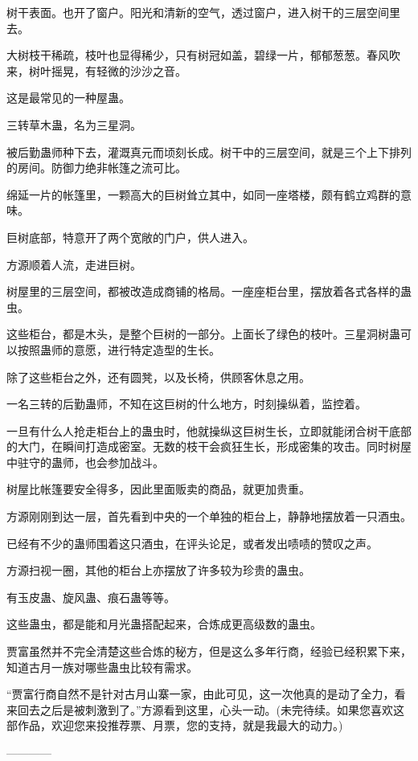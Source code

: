 \begin{this_body}
树干表面。也开了窗户。阳光和清新的空气，透过窗户，进入树干的三层空间里去。

大树枝干稀疏，枝叶也显得稀少，只有树冠如盖，碧绿一片，郁郁葱葱。春风吹来，树叶摇晃，有轻微的沙沙之音。

这是最常见的一种屋蛊。

三转草木蛊，名为三星洞。

被后勤蛊师种下去，灌溉真元而顷刻长成。树干中的三层空间，就是三个上下排列的房间。防御力绝非帐篷之流可比。

绵延一片的帐篷里，一颗高大的巨树耸立其中，如同一座塔楼，颇有鹤立鸡群的意味。

巨树底部，特意开了两个宽敞的门户，供人进入。

方源顺着人流，走进巨树。

树屋里的三层空间，都被改造成商铺的格局。一座座柜台里，摆放着各式各样的蛊虫。

这些柜台，都是木头，是整个巨树的一部分。上面长了绿色的枝叶。三星洞树蛊可以按照蛊师的意愿，进行特定造型的生长。

除了这些柜台之外，还有圆凳，以及长椅，供顾客休息之用。

一名三转的后勤蛊师，不知在这巨树的什么地方，时刻操纵着，监控着。

一旦有什么人抢走柜台上的蛊虫时，他就操纵这巨树生长，立即就能闭合树干底部的大门，在瞬间打造成密室。无数的枝干会疯狂生长，形成密集的攻击。同时树屋中驻守的蛊师，也会参加战斗。

树屋比帐篷要安全得多，因此里面贩卖的商品，就更加贵重。

方源刚刚到达一层，首先看到中央的一个单独的柜台上，静静地摆放着一只酒虫。

已经有不少的蛊师围着这只酒虫，在评头论足，或者发出啧啧的赞叹之声。

方源扫视一圈，其他的柜台上亦摆放了许多较为珍贵的蛊虫。

有玉皮蛊、旋风蛊、痕石蛊等等。

这些蛊虫，都是能和月光蛊搭配起来，合炼成更高级数的蛊虫。

贾富虽然并不完全清楚这些合炼的秘方，但是这么多年行商，经验已经积累下来，知道古月一族对哪些蛊虫比较有需求。

“贾富行商自然不是针对古月山寨一家，由此可见，这一次他真的是动了全力，看来回去之后是被刺激到了。”方源看到这里，心头一动。(未完待续。如果您喜欢这部作品，欢迎您来投推荐票、月票，您的支持，就是我最大的动力。)

------------

\end{this_body}

